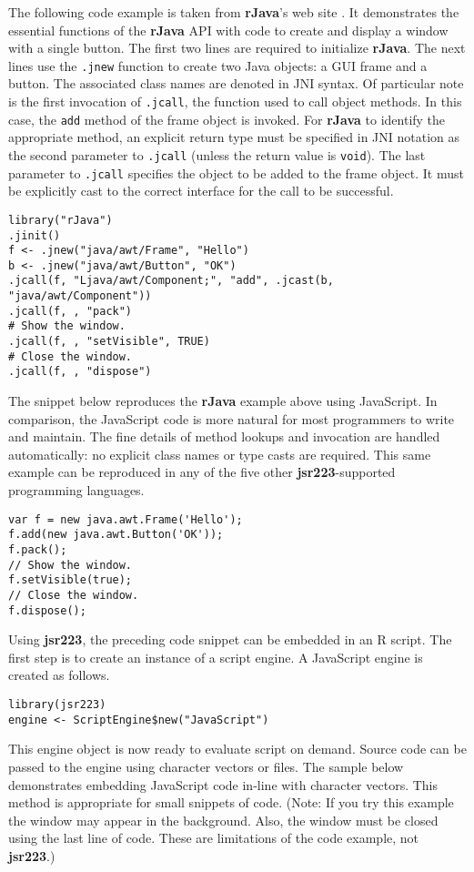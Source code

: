 \documentclass[
article,
11pt, %
a4paper, %
oneside, %
headinclude,footinclude, %
]{scrartcl}
\theoremstyle{definition} %
\theoremstyle{plain} %
\theoremstyle{remark} %
\newcommand{\pkg}[1]{\textbf{#1}}
\newcommand{\code}[1]{\texttt{#1}}
\begin{document}
The following code example is taken from \pkg{rJava}'s web site \citep{rjavaweb}. It demonstrates the essential functions of the \textbf{rJava} API with code to create and display a window with a single button. The first two lines are required to initialize \pkg{rJava}. The next lines use the \code{.jnew} function to create two Java objects: a GUI frame and a button. The associated class names are denoted in JNI syntax. Of particular note is the first invocation of \code{.jcall}, the function used to call object methods. In this case, the \code{add} method of the frame object is invoked. For \pkg{rJava} to identify the appropriate method, an explicit return type must be specified in JNI notation as the second parameter to \code{.jcall} (unless the return value is \code{void}). The last parameter to \code{.jcall} specifies the object to be added to the frame object. It must be explicitly cast to the correct interface for the call to be successful.

\begin{verbatim}
library("rJava")
.jinit()
f <- .jnew("java/awt/Frame", "Hello")
b <- .jnew("java/awt/Button", "OK")
.jcall(f, "Ljava/awt/Component;", "add", .jcast(b, "java/awt/Component"))
.jcall(f, , "pack")
# Show the window.
.jcall(f, , "setVisible", TRUE)
# Close the window.
.jcall(f, , "dispose")
\end{verbatim}

The snippet below reproduces the \pkg{rJava} example above using JavaScript. In comparison, the JavaScript code is more natural for most programmers to write and maintain. The fine details of method lookups and invocation are handled automatically: no explicit class names or type casts are required. This same example can be reproduced in any of the five other \pkg{jsr223}-supported programming languages.

\begin{verbatim}
var f = new java.awt.Frame('Hello');
f.add(new java.awt.Button('OK'));
f.pack();
// Show the window.
f.setVisible(true);
// Close the window.
f.dispose();
\end{verbatim}

Using \pkg{jsr223}, the preceding code snippet can be embedded in an R script. The first step is to create an instance of a script engine. A JavaScript engine is created as follows.

\begin{verbatim}
library(jsr223)
engine <- ScriptEngine$new("JavaScript")
\end{verbatim}
This engine object is now ready to evaluate script on demand. Source code can be passed to the engine using character vectors or files. The sample below demonstrates embedding JavaScript code in-line with character vectors. This method is appropriate for small snippets of code. (Note: If you try this example the window may appear in the background. Also, the window must be closed using the last line of code. These are limitations of the code example, not \pkg{jsr223}.)
\end{document}
